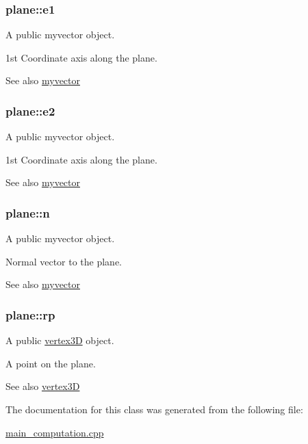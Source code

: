 \subsubsection[{\texorpdfstring{e1}{e1}}]{ plane\+::e1}\hypertarget{classplane_a8edd6c4f34e5caae715c1f08b9898830}{}\label{classplane_a8edd6c4f34e5caae715c1f08b9898830}


A public myvector object. 

1st Coordinate axis along the plane. \begin{DoxySeeAlso}{See also}
\hyperlink{classmyvector}{myvector} 
\end{DoxySeeAlso}
\subsubsection[{\texorpdfstring{e2}{e2}}]{ plane\+::e2}\hypertarget{classplane_aa642985b23f1d45bf21289bd71f4dc71}{}\label{classplane_aa642985b23f1d45bf21289bd71f4dc71}


A public myvector object. 

1st Coordinate axis along the plane. \begin{DoxySeeAlso}{See also}
\hyperlink{classmyvector}{myvector} 
\end{DoxySeeAlso}
\subsubsection[{\texorpdfstring{n}{n}}]{ plane\+::n}\hypertarget{classplane_abb04a85adeef50a5fa72d150b3e1c2ce}{}\label{classplane_abb04a85adeef50a5fa72d150b3e1c2ce}


A public myvector object. 

Normal vector to the plane. \begin{DoxySeeAlso}{See also}
\hyperlink{classmyvector}{myvector} 
\end{DoxySeeAlso}
\subsubsection[{\texorpdfstring{rp}{rp}}]{ plane\+::rp}\hypertarget{classplane_ad2046f04a70e35c5803a1ebcfb678cf9}{}\label{classplane_ad2046f04a70e35c5803a1ebcfb678cf9}


A public \hyperlink{classvertex3D}{vertex3D} object. 

A point on the plane. \begin{DoxySeeAlso}{See also}
\hyperlink{classvertex3D}{vertex3D} 
\end{DoxySeeAlso}


The documentation for this class was generated from the following file\+:\begin{DoxyCompactItemize}
\item 
\hyperlink{main__computation_8cpp}{main\+\_\+computation.\+cpp}\end{DoxyCompactItemize}
